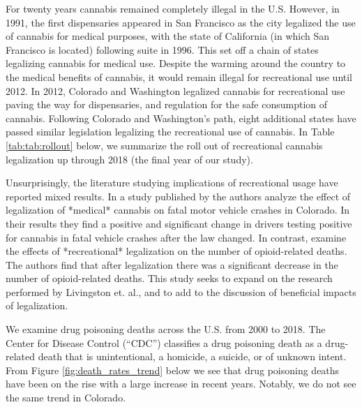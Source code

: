 \documentclass{article}
\begin{document}
For twenty years cannabis remained completely illegal in the U.S. However, in 1991, the first dispensaries appeared in San Francisco as the city legalized the use of cannabis for medical purposes, with the state of California (in which San Francisco is located) following suite in 1996. This set off a chain of states legalizing cannabis for medical use. Despite the warming around the country to the medical benefits of cannabis, it would remain illegal for recreational use until 2012. In 2012, Colorado and Washington legalized cannabis for recreational use paving the way for dispensaries, and regulation for the safe consumption of cannabis. Following Colorado and Washington's path, eight additional states have passed similar legislation legalizing the recreational use of cannabis. In Table \ref{tab:tab:rollout} below, we summarize the roll out of recreational cannabis legalization up through 2018 (the final year of our study).



Unsurprisingly, the literature studying implications of recreational usage have reported mixed results. In a study published by \citet{Salomonsen-SautelStacy2014Tifm} the authors analyze the effect of legalization of *medical* cannabis on fatal motor vehicle crashes in Colorado. In their results they find a positive and significant change in drivers testing positive for cannabis in fatal vehicle crashes after the law changed. In contrast, \citet{LivingstonMelvinD2017RCLa} examine the effects of *recreational* legalization on the number of opioid-related deaths. The authors find that after legalization there was a significant decrease in the number of opioid-related deaths. This study seeks to expand on the research performed by Livingston et. al., and to add to the discussion of beneficial impacts of legalization.

We examine drug poisoning deaths across the U.S. from 2000 to 2018. The Center for Disease Control (``CDC'') classifies a drug poisoning death as a drug-related death that is unintentional, a homicide, a suicide, or of unknown intent. From Figure \ref{fig:death_rates_trend} below we see that drug poisoning deaths have been on the rise with a large increase in recent years. Notably, we do not see the same trend in Colorado.
\end{document}
